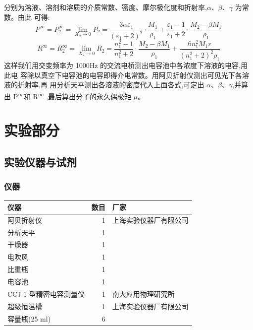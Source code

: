 \documentclass[11pt]{report}
\begin{document}
分别为溶液、溶剂和溶质的介质常数、密度、摩尔极化度和折射率,\(\alpha\)、\(\beta\)、\(\gamma\) 为常数。由此
可得:
\[
P^{\infty}=P^{\infty}_{2}=\lim_{X_{2}\to 0}P_{2}=\frac{3\alpha\varepsilon_{1}}{(\varepsilon_{1}+2)^{2}}\cdot\frac{M_{1}}{\rho_{1}}+\frac{\varepsilon_{1}-1}{\varepsilon_{1}+2}\cdot\frac{M_{2}-\beta M_{1}}{\rho_{1}}
\]
\[
R^{\infty}=R^{\infty}_{2}=\lim_{X_{2}\to 0}R_{2}=\frac{n_{1}^{2}-1}{n_{1}^{2}+2}\cdot\frac{M_{2}-\beta M_{1}}{\rho_{1}}+\frac{6n_{1}^{2}M_{1}r}{(n_{1}^{2}+2)^{2}\rho_{1}}
\]
这样我们用交变频率为 1000Hz 的交流电桥测出电容池中各浓度下溶液的电容,用此电
容除以真空下电容池的电容即得介电常数。用阿贝折射仪测出可见光下各溶液的折射率,再
用分析天平测出各溶液的密度代入上面各式,可定出 \(\alpha\)、\(\beta\)、\(\gamma\),并算出 P\textsuperscript{\(\infty\)}和 R\textsuperscript{\(\infty\)}
,最后算出分子的永久偶极矩 \(\mu\)。

\part{实验部分}
\label{sec:orgb8d66d1}
\chapter{实验仪器与试剂}
\label{sec:org2a09ba0}
\section{仪器}
\label{sec:orgb25879d}
\begin{center}
\begin{tabular}{lrl}
仪器 & 数目 & 厂家\\
\hline
阿贝折射仪 & 1 & 上海实验仪器厂有限公司\\
分析天平 & 1 & \\
干燥器 & 1 & \\
电吹风 & 1 & \\
比重瓶 & 1 & \\
电容池 & 1 & \\
CCJ-1 型精密电容测量仪 & 1 & 南大应用物理研究所\\
超级恒温槽 & 1 & 上海实验仪器厂有限公司\\
容量瓶(25 ml) & 6 & \\
\end{tabular}
\end{center}
\end{document}
